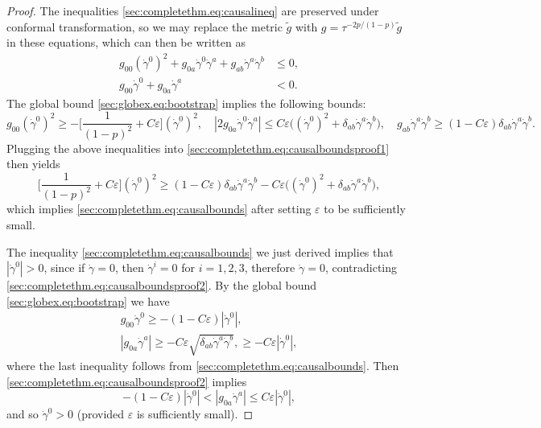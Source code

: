 \documentclass{article}
\newcommand{\wt}{\widetilde}
\newcommand{\ve}{\varepsilon}
\begin{document}
\begin{proof}
    The inequalities \eqref{sec:completethm.eq:causalineq} are preserved under conformal transformation, so we may replace the metric $\wt{g}$ with $g = \tau^{-2p/(1-p)}\wt{g}$ in these equations, which can  then be written as
    \begin{subequations}
        \begin{align}
            g_{00}(\dot{\gamma}^0)^2 + g_{0a}\dot{\gamma}^0\dot{\gamma}^a + g_{ab} \dot{\gamma}^a\dot{\gamma}^b &\leq 0,\label{sec:completethm.eq:causalboundsproof1}\\
            g_{00}\dot{\gamma}^0 + g_{0a} \dot{\gamma}^a &< 0.\label{sec:completethm.eq:causalboundsproof2}
        \end{align}
    \end{subequations}
    The global bound \eqref{sec:globex.eq:bootstrap} implies the following bounds:
    \begin{equation}
        g_{00}(\dot{\gamma}^0)^2 \geq - \Big[\frac{1}{(1-p)^2} + C\ve\Big](\dot{\gamma}^0)^2,\quad
        |2g_{0a}\dot{\gamma}^0\dot{\gamma}^a| \leq C\ve\big((\dot{\gamma}^0)^2 + \delta_{ab}\dot{\gamma}^a\dot{\gamma}^b\big),\quad
        g_{ab}\dot{\gamma}^a\dot{\gamma}^b \geq (1-C\ve)\delta_{ab}\dot{\gamma}^a\dot{\gamma}^b.
    \end{equation}
    Plugging the above inequalities into \eqref{sec:completethm.eq:causalboundsproof1} then yields
    \begin{equation}
         \Big[\frac{1}{(1-p)^2} + C\ve\Big](\dot{\gamma}^0)^2 \geq (1-C\ve)\delta_{ab}\dot{\gamma}^a\dot{\gamma}^b - C\ve\big((\dot{\gamma}^0)^2 + \delta_{ab}\dot{\gamma}^a\dot{\gamma}^b\big),
    \end{equation}
    which implies \eqref{sec:completethm.eq:causalbounds} after setting $\ve$ to be sufficiently small.

    The inequality \eqref{sec:completethm.eq:causalbounds} we just derived implies that $|\dot{\gamma}^0| > 0$, since if $\dot{\gamma} = 0$, then $\dot{\gamma}^i = 0$ for $i = 1,2,3$, therefore $\dot{\gamma} = 0$, contradicting \eqref{sec:completethm.eq:causalboundsproof2}. By the global bound \eqref{sec:globex.eq:bootstrap} we have
    \begin{subequations}
        \begin{gather}
            g_{00}\dot{\gamma}^0 \geq -(1-C\ve)|\dot{\gamma}^0|,\\
            |g_{0a}\dot{\gamma}^a| \geq -C\ve\sqrt{\delta_{ab}\dot{\gamma}^a\dot{\gamma}^b}, \geq -C\ve|\dot{\gamma}^0|,
        \end{gather}
    \end{subequations}
    where the last inequality follows from \eqref{sec:completethm.eq:causalbounds}. Then \eqref{sec:completethm.eq:causalboundsproof2} implies
    \begin{equation}
        -(1-C\ve)|\dot{\gamma}^0| <  |g_{0a} \dot{\gamma}^a| \leq C\ve|\dot{\gamma}^0|,
    \end{equation}
    and so $\dot{\gamma}^0 > 0$ (provided $\ve$ is sufficiently small).
\end{proof}
\end{document}
